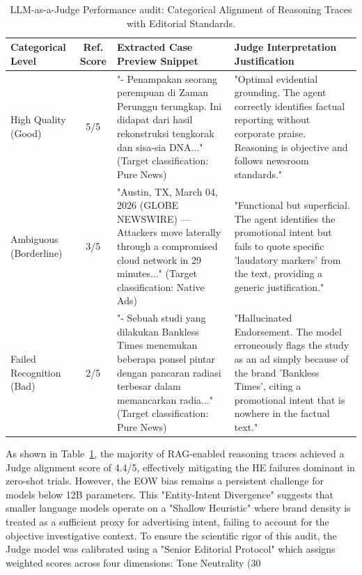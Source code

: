 \documentclass{ieeeaccess}
\begin{document}
\begin{table}[t]
\caption{LLM-as-a-Judge Performance audit: Categorical Alignment of Reasoning Traces with Editorial Standards.}
\label{tab:qualitative_analysis}
\begin{center}
\begin{tabular}{|l|c|p{}|p{}|}
\hline
\textbf{Categorical Level} & \textbf{Ref. Score} & \textbf{Extracted Case Preview Snippet} & \textbf{Judge Interpretation Justification} \\
\hline
High Quality (Good) & 5/5 & "- Penampakan seorang perempuan di Zaman Perunggu terungkap. Ini didapat dari hasil rekonstruksi tengkorak dan sisa-sia DNA..." (Target classification: Pure News) & "Optimal evidential grounding. The agent correctly identifies factual reporting without corporate praise. Reasoning is objective and follows newsroom standards." \\
\hline
Ambiguous (Borderline) & 3/5 & "Austin, TX, March 04, 2026 (GLOBE NEWSWIRE) — Attackers move laterally through a compromised cloud network in 29 minutes..." (Target classification: Native Ads) & "Functional but superficial. The agent identifies the promotional intent but fails to quote specific 'laudatory markers' from the text, providing a generic justification." \\
\hline
Failed Recognition (Bad) & 2/5 & "- Sebuah studi yang dilakukan Bankless Times menemukan beberapa ponsel pintar dengan pancaran radiasi terbesar dalam memancarkan radia..." (Target classification: Pure News) & "Hallucinated Endorsement. The model erroneously flags the study as an ad simply because of the brand 'Bankless Times', citing a promotional intent that is nowhere in the factual text." \\
\hline
\end{tabular}
\end{center}
\end{table}

As shown in Table~\ref{tab:qualitative_analysis}, the majority of RAG-enabled reasoning traces achieved a Judge alignment score of 4.4/5, effectively mitigating the HE failures dominant in zero-shot trials. However, the EOW bias remains a persistent challenge for models below 12B parameters. This "Entity-Intent Divergence" suggests that smaller language models operate on a "Shallow Heuristic" where brand density is treated as a sufficient proxy for advertising intent, failing to account for the objective investigative context. To ensure the scientific rigor of this audit, the Judge model was calibrated using a "Senior Editorial Protocol" which assigns weighted scores across four dimensions: Tone Neutrality (30%
\end{document}
